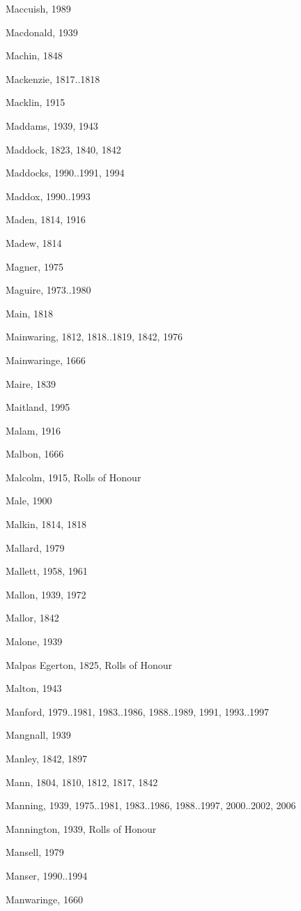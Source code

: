 {\begin{theindex}
\item Maccuish, 1989
\item Macdonald, 1939
\item Machin, 1848
\item Mackenzie, 1817..1818
\item Macklin, 1915
\item Maddams, 1939, 1943
\item Maddock, 1823, 1840, 1842
\item Maddocks, 1990..1991, 1994
\item Maddox, 1990..1993
\item Maden, 1814, 1916
\item Madew, 1814
\item Magner, 1975
\item Maguire, 1973..1980
\item Main, 1818
\item Mainwaring, 1812, 1818..1819, 1842, 1976
\item Mainwaringe, 1666
\item Maire, 1839
\item Maitland, 1995
\item Malam, 1916
\item Malbon, 1666
\item Malcolm, 1915, Rolls of Honour
\item Male, 1900
\item Malkin, 1814, 1818
\item Mallard, 1979
\item Mallett, 1958, 1961
\item Mallon, 1939, 1972
\item Mallor, 1842
\item Malone, 1939
\item Malpas Egerton, 1825, Rolls of Honour
\item Malton, 1943
\item Manford, 1979..1981, 1983..1986, 1988..1989, 1991, 1993..1997
\item Mangnall, 1939
\item Manley, 1842, 1897
\item Mann, 1804, 1810, 1812, 1817, 1842
\item Manning, 1939, 1975..1981, 1983..1986, 1988..1997, 2000..2002, 2006
\item Mannington, 1939, Rolls of Honour
\item Mansell, 1979
\item Manser, 1990..1994
\item Manwaringe, 1660

\end{theindex}}
